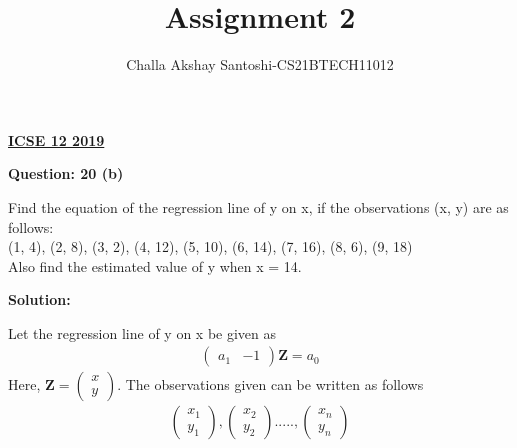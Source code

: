 \documentclass[journal,12pt,twocolumn]{IEEEtran}
\begin{document}
\newcommand{\myvec}[1]{\ensuremath{\begin{pmatrix}#1\end{pmatrix}}}
\newcommand{\mydet}[1]{\ensuremath{\begin{vmatrix}#1\end{vmatrix}}}
\makeatletter
{}
\makeatother
\let\StandardTheFigure\thefigure
\let\vec\mathbf
\renewcommand{\thefigure}{\theproblem}
\def\putbox#1#2#3{\makebox[0in][l]{\makebox[#1][l]{}\raisebox{\baselineskip}[0in][0in]{\raisebox{#2}[0in][0in]{#3}}}}
     \def\rightbox#1{\makebox[0in][r]{#1}}
     \def\centbox#1{\makebox[0in]{#1}}
     \def\topbox#1{\raisebox{-\baselineskip}[0in][0in]{#1}}
     \def\midbox#1{\raisebox{-0.5\baselineskip}[0in][0in]{#1}}
\vspace{3cm}
\title{Assignment 2}
\author{Challa Akshay Santoshi-CS21BTECH11012}
\maketitle
\newpage
\bigskip
\renewcommand{\thefigure}{\theenumi}
\renewcommand{\thetable}{\theenumi}
\begin{center}
  \textbf{\underline{ICSE 12 2019}}\\
\end{center}
\begin{center}
  \textbf{Question: 20 (b)}  
\end{center}
Find the equation of the regression line of y on x, if the observations (x, y) are as follows:\\
(1, 4), (2, 8), (3, 2), (4, 12), (5, 10), (6, 14), (7, 16), (8, 6), (9, 18)\\
Also find the estimated value of y when x = 14.\\
\begin{center}
  \textbf{Solution:}  
\end{center}
Let the regression line of y on x be given as\\
\begin{align}
    \myvec{a_1 & -1}\vec{Z} = a_0\label{eq:1}
\end{align}
Here, $\vec{Z} = \myvec{x\\y}$.
The observations given can be written as follows\\
\begin{align}
		 \myvec{x_1\\y_1},\myvec{x_2\\y_2}.....,\myvec{x_n\\y_n}
\end{align}
\end{document}
